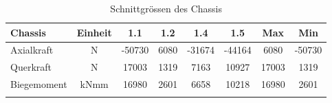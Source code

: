 \begin{table}[H]
\centering
\begin{tabular}{lccccccc}
\thickhline
Chassis	&	Einheit	&	1.1	&	1.2	&	1.4	&	1.5	&	Max	&	Min	\\	\hline
Axialkraft	&	N	&	-50730	&	6080	&	-31674	&	-44164	&	6080	&	-50730	\\
Querkraft	&	N	&	17003	&	1319	&	7163	&	10927	&	17003	&	1319	\\
Biegemoment	&	kNmm	&	16980	&	2601	&	6658	&	10218	&	16980	&	2601	\\	\thickhline
\end{tabular}
\caption{Schnittgrössen des Chassis}
\label{tab:FEMres Chassis}
\end{table}





\newpage
